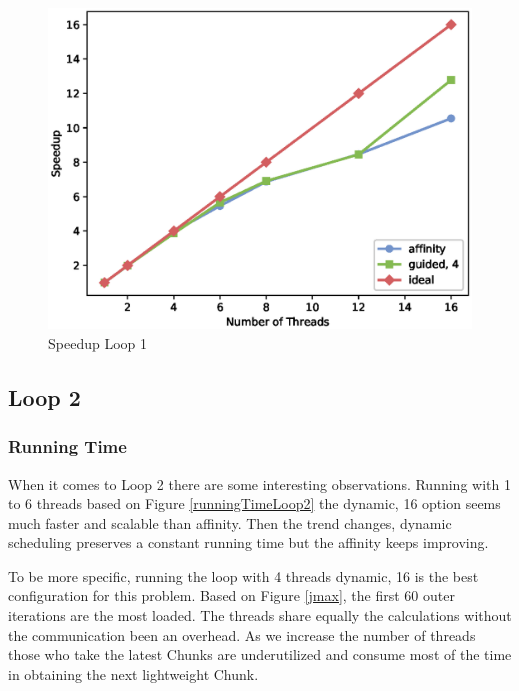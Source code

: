 \documentclass[12pt,a4paper]{article}
\begin{document}
\begin{figure}[h!]
    \centering
    \includegraphics[scale=0.6]{../graphs/loop1_speedup.eps}
    \caption{Speedup Loop 1}
    \label{speedupLoop1}
\end{figure}

\subsection{Loop 2}

\subsubsection{Running Time}

When it comes to Loop 2 there are some interesting observations. Running with 1 to 6 threads based on Figure \ref{runningTimeLoop2} the dynamic, 16 option seems much faster and scalable than affinity. Then the trend changes, dynamic scheduling preserves a constant running time but the affinity keeps improving.

To be more specific, running the loop with 4 threads dynamic, 16 is the best configuration for this problem. Based on Figure \ref{jmax}, the first 60 outer iterations are the most loaded. The threads share equally the calculations without the communication been an overhead. As we increase the number of threads those who take the latest Chunks are underutilized and consume most of the time in obtaining the next lightweight Chunk.
\end{document}
